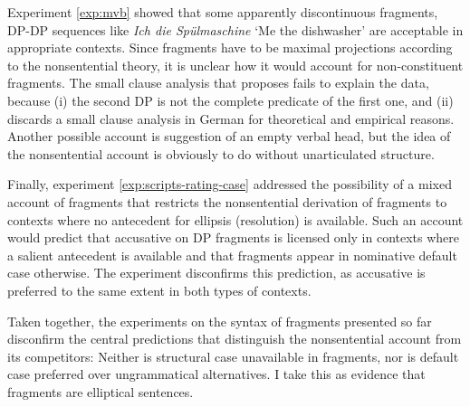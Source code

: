 Experiment \ref{exp:mvb} showed that some apparently discontinuous fragments, DP-DP sequences like \textit{Ich die Spülmaschine} `Me the dishwasher' are acceptable in appropriate contexts. Since fragments have to be maximal projections according to the nonsentential theory, it is unclear how it would account for non-constituent fragments. The small clause analysis that \citet{progovac2006} proposes fails to explain the data, because (i) the second DP is not the  complete predicate of the first one, and (ii) \citet{reich2017} discards a small clause analysis in German for theoretical and empirical reasons. Another possible account is  suggestion of an empty verbal head, but the idea of the nonsentential account is obviously to do without unarticulated structure.

Finally, experiment \ref{exp:scripts-rating-case} addressed the possibility of a mixed account of fragments that restricts the nonsentential derivation of fragments to contexts where no antecedent for ellipsis (resolution) is available. Such an account would predict that accusative on DP fragments is licensed only in contexts where a salient antecedent is available and that fragments appear in nominative default case otherwise. The experiment disconfirms this prediction, as accusative is preferred to the same extent in both types of contexts. 

\newpage
\noindent Taken together, the experiments on the syntax of fragments presented so far disconfirm the central predictions that distinguish the nonsentential account from its competitors: Neither is structural case unavailable in fragments, nor is default case preferred over ungrammatical alternatives. I take this as evidence that fragments are elliptical sentences.

